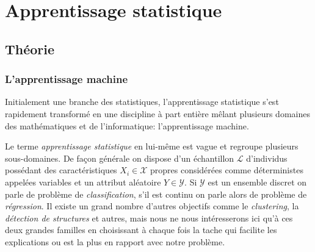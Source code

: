 
\chapter{Apprentissage statistique}
\label{chap:deux}

\section{Théorie}

\subsection{L'apprentissage machine}

Initialement une branche des statistiques, l'apprentissage statistique s'est rapidement transformé en une discipline à part entière mêlant plusieurs domaines des mathématiques et de l'informatique: l'apprentissage machine.

Le terme \emph{apprentissage statistique} en lui-même est vague et regroupe plusieurs sous-domaines. De façon générale on dispose d'un échantillon $\mathcal{L}$ d'individus possédant des caractéristiques $X_i \in \mathcal{X}$ propres considérées comme déterministes appelées variables et un attribut aléatoire $Y \in \mathcal{Y}$. Si $\mathcal{Y}$ est un ensemble discret on parle de problème de \emph{classification}, s’il est continu on parle alors de problème de \emph{régression}. Il existe un grand nombre d'autres objectifs comme le \emph{clustering}, la \emph{détection de structures} et autres, mais nous ne nous intéresserons ici qu'à ces deux grandes familles en choisissant à chaque fois la tache qui facilite les explications ou est la plus en rapport avec notre problème.

